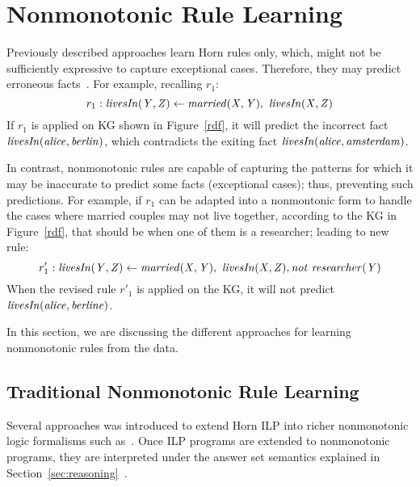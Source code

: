 \section{Nonmonotonic Rule Learning}\label{sec:nmrulelearn}

Previously described approaches learn Horn rules only, which, might not be sufficiently expressive to capture
exceptional cases. Therefore, they may predict erroneous facts~\cite{rumis}. For example, recalling $r_1$:
\[r_1 : \mathit{livesIn(Y,Z)} \leftarrow \mathit{married(X,Y)},\ \mathit{livesIn(X,Z)} \]
If $r_1$ is applied on KG shown in Figure~\ref{rdf}, it will predict the incorrect fact $\mathit{livesIn(alice,berlin)}$, which contradicts the exiting fact $\mathit{livesIn(alice, amsterdam)}$. 

In contrast, nonmonotonic rules are capable of capturing the patterns for which it may be inaccurate to predict some facts (\ie exceptional cases); thus, preventing such predictions. For example, if $r_1$ can be adapted into a nonmontonic form to handle the cases where married couples may not live together, according to the KG in Figure~\ref{rdf}, that should be when one of them is a researcher; leading to new rule:
\[r'_1 : \mathit{livesIn(Y,Z)} \leftarrow \mathit{married(X,Y)},\ \mathit{livesIn(X,Z)}, \mathit{not}~ \mathit{researcher(Y)}\]
When the revised rule $r'_1$ is applied on the KG, it will not predict $\mathit{livesIn(alice,berline)}$. 

In this section, we are discussing the different approaches for learning nonmonotonic rules from the data.


\subsection{Traditional Nonmonotonic Rule Learning}
Several approaches was introduced to extend Horn ILP into richer nonmonotonic logic formalisms such as~\cite{DBLP:conf/ijcai/InoueK97,DBLP:journals/tocl/Sakama05,R08,CorapiRL10,ILASP_system}. Once ILP programs are extended to nonmonotonic programs, they are interpreted under the answer set semantics explained in Section~\ref{sec:reasoning}~\cite{Shakerin2018}.


